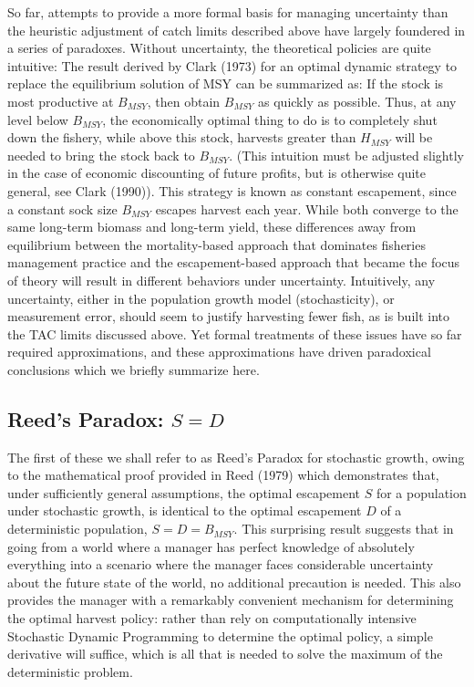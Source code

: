 \documentclass[3p]{elsarticle} %
\begin{document}
So far, attempts to provide a more formal basis for managing uncertainty
than the heuristic adjustment of catch limits described above have
largely foundered in a series of paradoxes. Without uncertainty, the
theoretical policies are quite intuitive: The result derived by Clark
(1973) for an optimal dynamic strategy to replace the equilibrium
solution of MSY can be summarized as: If the stock is most productive at
\(B_{MSY}\), then obtain \(B_{MSY}\) as quickly as possible. Thus, at
any level below \(B_{MSY}\), the economically optimal thing to do is to
completely shut down the fishery, while above this stock, harvests
greater than \(H_{MSY}\) will be needed to bring the stock back to
\(B_{MSY}\). (This intuition must be adjusted slightly in the case of
economic discounting of future profits, but is otherwise quite general,
see Clark (1990)). This strategy is known as constant escapement, since
a constant sock size \(B_{MSY}\) escapes harvest each year. While both
converge to the same long-term biomass and long-term yield, these
differences away from equilibrium between the mortality-based approach
that dominates fisheries management practice and the escapement-based
approach that became the focus of theory will result in different
behaviors under uncertainty. Intuitively, any uncertainty, either in the
population growth model (stochasticity), or measurement error, should
seem to justify harvesting fewer fish, as is built into the TAC limits
discussed above. Yet formal treatments of these issues have so far
required approximations, and these approximations have driven
paradoxical conclusions which we briefly summarize here.

\subsection{\texorpdfstring{Reed's Paradox:
\(S = D\)}{Reed's Paradox: S = D}}\label{reeds-paradox-s-d}

The first of these we shall refer to as Reed's Paradox for stochastic
growth, owing to the mathematical proof provided in Reed (1979) which
demonstrates that, under sufficiently general assumptions, the optimal
escapement \(S\) for a population under stochastic growth, is identical
to the optimal escapement \(D\) of a deterministic population,
\(S = D = B_{MSY}\). This surprising result suggests that in going from
a world where a manager has perfect knowledge of absolutely everything
into a scenario where the manager faces considerable uncertainty about
the future state of the world, no additional precaution is needed. This
also provides the manager with a remarkably convenient mechanism for
determining the optimal harvest policy: rather than rely on
computationally intensive Stochastic Dynamic Programming to determine
the optimal policy, a simple derivative will suffice, which is all that
is needed to solve the maximum of the deterministic problem.
\end{document}
